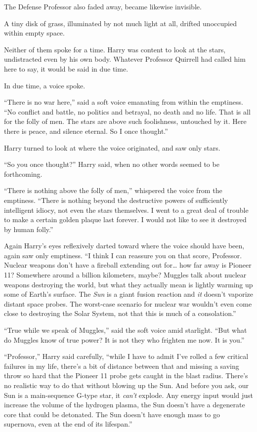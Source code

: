 The Defense Professor also faded away, became likewise invisible.

A tiny disk of grass, illuminated by not much light at all, drifted
unoccupied within empty space.

Neither of them spoke for a time. Harry was content to look at the
stars, undistracted even by his own body. Whatever Professor Quirrell
had called him here to say, it would be said in due time.

In due time, a voice spoke.

``There is no war here,'' said a soft voice emanating from within the
emptiness. ``No conflict and battle, no politics and betrayal, no death
and no life. That is all for the folly of men. The stars are above such
foolishness, untouched by it. Here there is peace, and silence eternal.
So I once thought.''

Harry turned to look at where the voice originated, and saw only stars.

``So you once thought?'' Harry said, when no other words seemed to be
forthcoming.

``There is nothing above the folly of men,'' whispered the voice from
the emptiness. ``There is nothing beyond the destructive powers of
sufficiently intelligent idiocy, not even the stars themselves. I went
to a great deal of trouble to make a certain golden plaque last forever.
I would not like to see it destroyed by human folly.''

Again Harry's eyes reflexively darted toward where the voice should have
been, again saw only emptiness. ``I think I can reassure you on that
score, Professor. Nuclear weapons don't have a fireball extending out
for\ldots{} how far away is Pioneer 11? Somewhere around a billion
kilometers, maybe? Muggles talk about nuclear weapons destroying the
world, but what they actually mean is lightly warming up some of Earth's
surface. The \emph{Sun} is a giant fusion reaction and \emph{it} doesn't
vaporize distant space probes. The worst-case scenario for nuclear war
wouldn't even come close to destroying the Solar System, not that this
is much of a consolation.''

``True while we speak of Muggles,'' said the soft voice amid starlight.
``But what do Muggles know of true power? It is not they who frighten me
now. It is you.''

``Professor,'' Harry said carefully, ``while I have to admit I've rolled
a few critical failures in my life, there's a bit of distance between
that and missing a saving throw so hard that the Pioneer 11 probe gets
caught in the blast radius. There's no realistic way to do that without
blowing up the Sun. And before you ask, our Sun is a main-sequence
G-type star, it \emph{can't} explode. Any energy input would just
increase the volume of the hydrogen plasma, the Sun doesn't have a
degenerate core that could be detonated. The Sun doesn't have enough
mass to go supernova, even at the end of its lifespan.''

